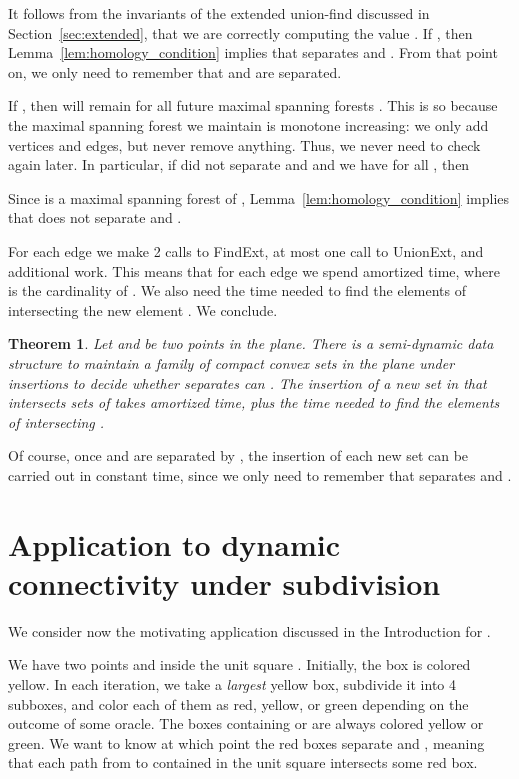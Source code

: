 \documentclass[a4paper,11pt]{article}
\def\findext{\mbox{\sc FindExt}}
\def\unionext{\mbox{\sc UnionExt}}
\newtheorem{theorem}{Theorem}
\begin{document}
It follows from the invariants of the extended union-find discussed in
Section~\ref{sec:extended}, that we are correctly computing the value
. 
If , then Lemma~\ref{lem:homology_condition}
implies that  separates  and . From that point on,
we only need to remember that  and  are separated.

If , then  will
remain  for all future maximal spanning forests .
This is so because the maximal spanning forest we maintain is monotone increasing:
we only add vertices and edges, but never remove anything.
Thus, we never need to check  again later.
In particular, if  did not separate  and  and 
we have  for all ,
then

Since  is a maximal spanning forest of ,
Lemma~\ref{lem:homology_condition} implies that  
does not separate  and . 

For each edge  we make 2 calls to \findext, at most one call to \unionext,
and additional  work. This means that for each edge we spend
 amortized time, where  is the cardinality of .
We also need the time needed to find the elements of  intersecting the new
element . We conclude.

\begin{theorem}
\label{thm:main}
	Let  and  be two points in the plane.
	There is a semi-dynamic data structure to maintain a family  of  compact convex
	sets in the plane under insertions to decide whether  separates  can .
	The insertion of a new set  in  that intersects  sets of  
	takes  amortized time, plus the time needed to find
	the  elements of  intersecting .
\end{theorem}

Of course, once  and  are separated by , the insertion of each new
set can be carried out in constant time, since we only need to remember that
 separates  and .


\section{Application to dynamic connectivity under subdivision}
\label{sec:subdivision}

We consider now the motivating application discussed in the Introduction for .

We have two points  and  inside the unit square .
Initially, the box  is colored yellow.
In each iteration, we take a \emph{largest} yellow box, subdivide it into
4 subboxes, and color each of them as red, yellow, or green 
depending on the outcome of some oracle.
The boxes containing  or  are always colored yellow or green.
We want to know at which point the red boxes separate  and , meaning
that each path from  to  contained in the unit square 
intersects some red box. 
\end{document}
